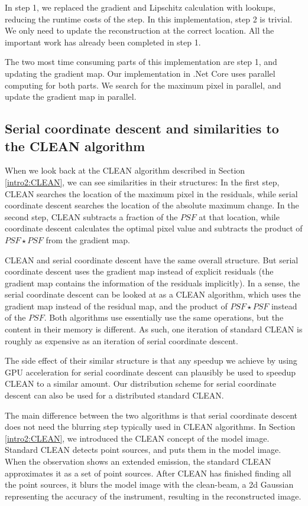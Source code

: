 In step 1, we replaced the gradient and Lipschitz calculation with lookups, reducing the runtime costs of the step. In this implementation, step 2 is trivial. We only need to update the reconstruction at the correct location. All the important work has already been completed in step 1.

The two most time consuming parts of this implementation are step 1, and updating the gradient map. Our implementation in .Net Core uses parallel computing for both parts. We search for the maximum pixel in parallel, and update the gradient map in parallel.




\subsection{Serial coordinate descent and similarities to the CLEAN algorithm}\label{cd:similarities}
When we look back at the CLEAN algorithm described in Section \ref{intro2:CLEAN}, we can see similarities in their structures: In the first step, CLEAN searches the location of the maximum pixel in the residuals, while serial coordinate descent searches the location of the absolute maximum change. In the second step, CLEAN subtracts a fraction of the $PSF$ at that location, while coordinate descent calculates the optimal pixel value and subtracts the product of $PSF \star PSF$ from the gradient map. 

CLEAN and serial coordinate descent have the same overall structure. But serial coordinate descent uses the gradient map instead of explicit residuals (the gradient map contains the information of the residuals implicitly). In a sense, the serial coordinate descent can be looked at as a CLEAN algorithm, which uses the gradient map instead of the residual map, and the product of $PSF \star PSF$ instead of the $PSF$. Both algorithms use essentially use the same operations, but the content in their memory is different. As such, one iteration of standard CLEAN is roughly as expensive as an iteration of serial coordinate descent. 

The side effect of their similar structure is that any speedup we achieve by using GPU acceleration for serial coordinate descent can plausibly be used to speedup CLEAN to a similar amount. Our distribution scheme for serial coordinate descent can also be used for a distributed standard CLEAN. 

The main difference between the two algorithms is that serial coordinate descent does not need the blurring step typically used in CLEAN algorithms. In Section \ref{intro2:CLEAN}, we introduced the CLEAN concept of the model image. Standard CLEAN detects point sources, and puts them in the model image. When the observation shows an extended emission, the standard CLEAN approximates it as a set of point sources. After CLEAN has finished finding all the point sources, it blurs the model image with the clean-beam, a 2d Gaussian representing the accuracy of the instrument, resulting in the reconstructed image.

